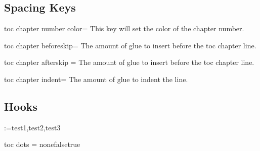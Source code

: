 \subsection{Spacing Keys}
\begin{docKey}[phd]{toc chapter number color}{=}{}
This key will set the color of the chapter number.
\end{docKey}

\begin{docKey}[phd]{toc chapter beforeskip}{=}{}
The amount of glue to insert before the toc chapter line.
\end{docKey}

\begin{docKey}[phd]{toc chapter afterskip}{ =}{}
The amount of glue to insert before the toc chapter line.
\end{docKey}

\begin{docKey}[phd]{toc chapter indent}{=}{}
The amount of glue to indent the line.
\end{docKey}
\subsection{Hooks}


\makeatletter
\def\options#1{
\@for\next:=#1\do{%
\textbar\next%
}%
\textbar%
}%
\options{test1,test2,test3}
\makeatother
\begin{docKey}[phd]{toc dots}{ = \textbar none\textbar false\textbar true}{}
\end{docKey}

%
%
%
%

